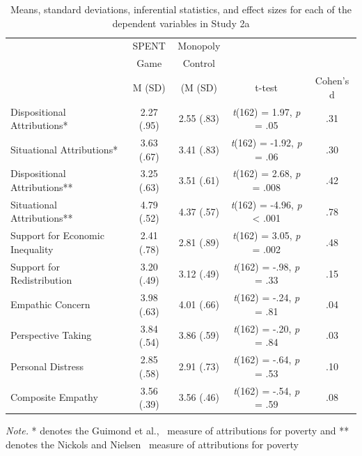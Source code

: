 \documentclass{sfuthesis}
\begin{document}
\begin{table}[h]
  \begin{center}
    \caption{Means, standard deviations, inferential statistics, and effect sizes for each of the dependent variables in Study 2a}
    \label{tab:thirdtable}
    \begin{tabular}{l c c c c}
    \hline
      & \multicolumn{1}{c}{SPENT} & \multicolumn{1}{c}{Monopoly} & & \\
      & \multicolumn{1}{c}{Game} & \multicolumn{1}{c}{Control} & & \\\cmidrule{2-3}
      & \multicolumn{1}{c}{M (SD)} & \multicolumn{1}{c}{(M (SD)} & t-test & Cohen's d\\
      \hline
      Dispositional Attributions* & \multicolumn{1}{c}{2.27 (.95)} & \multicolumn{1}{c}{2.55 (.83)} & \multicolumn{1}{c}{\textit{t}(162) = 1.97, \textit{p} = .05} & .31\\
      Situational Attributions* & \multicolumn{1}{c}{3.63 (.67)} & \multicolumn{1}{c}{3.41 (.83)} & \multicolumn{1}{c}{\textit{t}(162) = -1.92, \textit{p} = .06} & .30\\
      Dispositional Attributions** & \multicolumn{1}{c}{3.25 (.63)} & \multicolumn{1}{c}{3.51 (.61)} & \multicolumn{1}{c}{\textit{t}(162) = 2.68, \textit{p} = .008} & .42\\
      Situational Attributions** & \multicolumn{1}{c}{4.79 (.52)} & \multicolumn{1}{c}{4.37 (.57)} & \multicolumn{1}{c}{\textit{t}(162) = -4.96, \textit{p} < .001} & .78\\
      Support for Economic Inequality & \multicolumn{1}{c}{2.41 (.78)} & \multicolumn{1}{c}{2.81 (.89)} & \multicolumn{1}{c}{\textit{t}(162) = 3.05, \textit{p} = .002} & .48\\
      Support for Redistribution & \multicolumn{1}{c}{3.20 (.49)} & \multicolumn{1}{c}{3.12 (.49)} & \multicolumn{1}{c}{\textit{t}(162) = -.98, \textit{p} = .33} & .15\\
      Empathic Concern & \multicolumn{1}{c}{3.98 (.63)} & \multicolumn{1}{c}{4.01 (.66)} & \multicolumn{1}{c}{\textit{t}(162) = -.24, \textit{p} = .81} & .04\\
      Perspective Taking & \multicolumn{1}{c}{3.84 (.54)} & \multicolumn{1}{c}{3.86 (.59)} & \multicolumn{1}{c}{\textit{t}(162) = -.20, \textit{p} = .84} & .03\\
      Personal Distress & \multicolumn{1}{c}{2.85 (.58)} & \multicolumn{1}{c}{2.91 (.73)} & \multicolumn{1}{c}{\textit{t}(162) = -.64, \textit{p} = .53} & .10\\
      Composite Empathy & \multicolumn{1}{c}{3.56 (.39)} & \multicolumn{1}{c}{3.56 (.46)} & \multicolumn{1}{c}{\textit{t}(162) = -.54, \textit{p} = .59} & .08\\
      \hline
    \end{tabular}
  \end{center}
  \textit{Note.} * denotes the Guimond et al.,~\cite{guimond89} measure of attributions for poverty and ** denotes the Nickols and Nielsen~\cite{nickols11} measure of attributions for poverty
\end{table}
\end{document}

